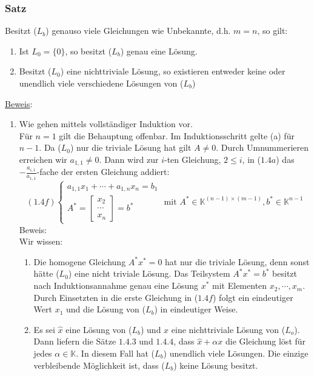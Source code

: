 \subsubsection{Satz}
Besitzt ($L_b$) genauso viele Gleichungen wie Unbekannte, d.h. $m=n$, so gilt:
\renewcommand{\labelenumi}{(\alph{enumi})}
\begin{enumerate}
\item Ist $L_0=\{0\}$, so besitzt ($L_b$) genau eine Lösung.
\item Besitzt ($L_0$) eine nichttriviale Lösung, so existieren entweder keine oder unendlich viele verschiedene Lösungen von ($L_b$)
\end{enumerate}
\underline{Beweis}:
\begin{enumerate}
\item Wie gehen mittels vollständiger Induktion vor.\\
Für $n=1$ gilt die Behauptung offenbar.  Im Induktionsschritt gelte (a) für $n-1$.  Da ($L_0$) nur die triviale Lösung hat gilt $A\not= 0$.  Durch Umnummerieren erreichen wir $a_{1,1}\not= 0$.  Dann wird zur $i$-ten Gleichung, $2\leq i$, in ($1.4a$) das $-\frac{a_{i,1}}{a_{1,1}}$-fache der ersten Gleichung addiert:
\[(1.4f)\begin{cases}a_{1,1}x_1+\cdots +a_{1,n}x_n = b_1\\ A^*=\left[\begin{array}{c}x_2\\ \cdots \\ x_n\end{array}\right]= b^*\end{cases} \text{ mit }A^*\in \mathbb{K}^{(n-1)\times (m-1)}, b^*\in \mathbb{K}^{n-1} \]
Beweis: \\
Wir wissen:
\begin{enumerate}
\item Die homogene Gleichung $A^*x^* = 0$ hat nur die triviale Lösung, denn sonst hätte ($L_0$) eine nicht triviale Lösung.  Das Teilsystem $A^*x^* = b^*$ besitzt nach Induktionsannahme genau eine Lösung $x^*$ mit Elementen $x_2,\cdots ,x_m$.  Durch Einsetzten in die erste Gleichung in ($1.4f$) folgt ein eindeutiger Wert $x_1$ und die Lösung von ($L_b$) in eindeutiger Weise.
\item Es sei $\hat{x}$ eine Lösung von ($L_b$) und $x$ eine nichttriviale Lösung von ($L_o$).  Dann liefern die Sätze $1.4.3$ und $1.4.4$, dass $\hat{x}+\alpha x$ die Gleichung löst für jedes $\alpha \in \mathbb{K}$.  In diesem Fall hat ($L_b$) unendlich viele Lösungen.  Die einzige verbleibende Möglichkeit ist, dass ($L_b$) keine Lösung besitzt.
\end{enumerate}
\end{enumerate}